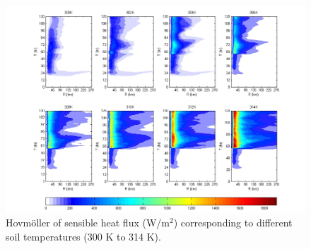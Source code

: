 \documentclass[fleqn,10pt]{wlscirep}
\begin{document}
\begin{figure}[ht]
\centering
\includegraphics[width=\linewidth]{hfx_temp}
\caption{Hovmöller of sensible heat flux (W/m$^{2}$) corresponding to different soil temperatures (300 K to 314 K).}
\label{fig:hfx_temp}
\end{figure}
\end{document}
